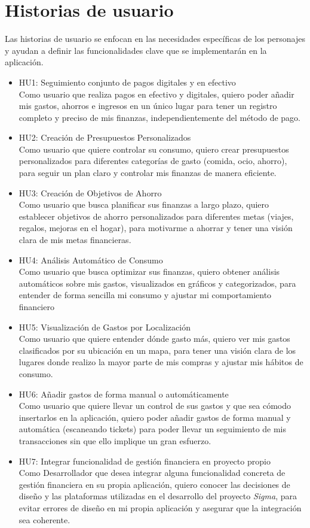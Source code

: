 \section{Historias de usuario}
Las historias de usuario se enfocan en las necesidades específicas de los personajes y ayudan a definir las funcionalidades clave que se implementarán en la aplicación.

\begin{itemize}
    \item HU1: Seguimiento conjunto de pagos digitales y en efectivo\\
    Como usuario que realiza pagos en efectivo y digitales,
    quiero poder añadir mis gastos, ahorros e ingresos en un único lugar
    para tener un registro completo y preciso de mis finanzas, independientemente del método de pago.
    \item HU2: Creación de Presupuestos Personalizados\\
    Como usuario que quiere controlar su consumo,
    quiero crear presupuestos personalizados para diferentes categorías de gasto (comida, ocio, ahorro),
    para seguir un plan claro y controlar mis finanzas de manera eficiente.
    \item HU3: Creación de Objetivos de Ahorro\\
    Como usuario que busca planificar sus finanzas a largo plazo,
    quiero establecer objetivos de ahorro personalizados para diferentes metas (viajes, regalos, mejoras en el hogar),
    para motivarme a ahorrar y tener una visión clara de mis metas financieras.
    \item HU4: Análisis Automático de Consumo\\
    Como usuario que busca optimizar sus finanzas,
    quiero obtener análisis automáticos sobre mis gastos, visualizados en gráficos y categorizados,
    para entender de forma sencilla mi consumo y ajustar mi comportamiento financiero
    \item HU5: Visualización de Gastos por Localización\\
    Como usuario que quiere entender dónde gasto más,
    quiero ver mis gastos clasificados por su ubicación en un mapa,
    para tener una visión clara de los lugares donde realizo la mayor parte de mis compras y ajustar mis hábitos de consumo.
    \item HU6: Añadir gastos de forma manual o automáticamente\\ 
    Como usuario que quiere llevar un control de sus gastos y que sea cómodo insertarlos en la aplicación, quiero poder añadir gastos de forma manual y automática (escaneando tickets) para poder llevar un seguimiento de mis transacciones sin que ello implique un gran esfuerzo.
    \item HU7: Integrar funcionalidad de gestión financiera en proyecto propio\\
    Como Desarrollador que desea integrar alguna funcionalidad concreta de gestión financiera en su propia aplicación, quiero conocer las decisiones de diseño y las plataformas utilizadas en el desarrollo del proyecto \textit{Sigma}, para evitar errores de diseño en mi propia aplicación y asegurar que la integración sea coherente.
    

\end{itemize}
